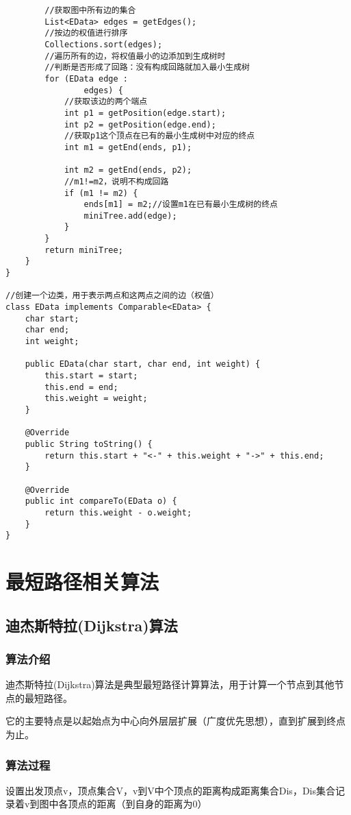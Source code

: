 \documentclass[a4paper]{report}
\begin{document}
\begin{lstlisting}
        //获取图中所有边的集合
        List<EData> edges = getEdges();
        //按边的权值进行排序
        Collections.sort(edges);
        //遍历所有的边，将权值最小的边添加到生成树时
        //判断是否形成了回路：没有构成回路就加入最小生成树
        for (EData edge :
                edges) {
            //获取该边的两个端点
            int p1 = getPosition(edge.start);
            int p2 = getPosition(edge.end);
            //获取p1这个顶点在已有的最小生成树中对应的终点
            int m1 = getEnd(ends, p1);

            int m2 = getEnd(ends, p2);
            //m1!=m2，说明不构成回路
            if (m1 != m2) {
                ends[m1] = m2;//设置m1在已有最小生成树的终点
                miniTree.add(edge);
            }
        }
        return miniTree;
    }
}

//创建一个边类，用于表示两点和这两点之间的边（权值）
class EData implements Comparable<EData> {
    char start;
    char end;
    int weight;

    public EData(char start, char end, int weight) {
        this.start = start;
        this.end = end;
        this.weight = weight;
    }

    @Override
    public String toString() {
        return this.start + "<-" + this.weight + "->" + this.end;
    }

    @Override
    public int compareTo(EData o) {
        return this.weight - o.weight;
    }
}
\end{lstlisting}
\section{最短路径相关算法}
\subsection{迪杰斯特拉(Dijkstra)算法}
\subsubsection{算法介绍}
迪杰斯特拉(Dijkstra)算法是典型最短路径计算算法，用于计算一个节点到其他节点的最短路径。

它的主要特点是以起始点为中心向外层层扩展（广度优先思想），直到扩展到终点为止。
\subsubsection{算法过程}
设置出发顶点v，顶点集合V，v到V中个顶点的距离构成距离集合Dis，Dis集合记录着v到图中各顶点的距离（到自身的距离为0）
\end{document}
